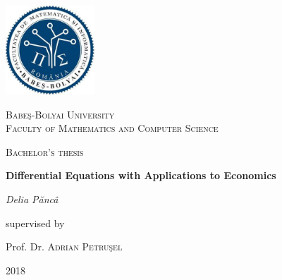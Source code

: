 \documentclass[a4paper,11pt]{report}
\newcommand\blankpage{%
    \null
    \thispagestyle{empty}%
    \addtocounter{page}{-1}%
    \newpage}
\begin{document}
 \begin{titlepage}
	\centering
	\includegraphics[width=0.25\textwidth]{Facultate1.jpg}\par\vspace{1cm}
	{\scshape\LARGE Babe\c{s}-Bolyai University \\ Faculty of Mathematics and Computer Science \par}
	\vspace{1cm}
	{\scshape\Large Bachelor's thesis\par}
	\vspace{1.5cm}
	{\huge\bfseries Differential Equations with Applications to Economics\par}
	\vspace{2cm}
	{\Large\itshape Delia P\u{a}nc\^{a}\par}
	\vfill
	supervised by\par
	Prof. Dr.  \textsc{Adrian Petru\c{s}el}

	\vfill

	{2018}
\end{titlepage}
 \tableofcontents
 \blankpage
\end{document}
